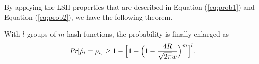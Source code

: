 By applying the LSH properties that are described in Equation (\ref{eq:prob1}) and Equation (\ref{eq:prob2}), we have the following theorem.

\begin{theorem}
\label{the:prob3}
With $l$ groups of $m$ hash functions, the probability is finally enlarged as
\begin{equation}\label{eq:lm:prob3}
\emph{Pr}[\hat\rho_i=\rho_i]\geq 1-\Big[1-\Big(1-\frac{4R}{\sqrt{2\pi}w}\Big)^m\Big]^l.
\end{equation}
\end{theorem}

\begin{comment}
\begin{proof}
After applying $l$ groups of $m$ hash functions, we will obtain $l$ $\hat\rho_i^g$ values $(1\leq g\leq l)$. According to the definition of $\rho_i$, we have
$\hat\rho_i^g \leq \max_{g}\hat\rho_i^g \leq \hat\rho_i$. If
$\max_{g}\hat\rho_i^g \neq \rho_i$, then
$\hat\rho_i^g\neq \rho_i$ for all $1\leq g\leq l$.

From Lemma 1, under a single hash function the probability that $p_i$ and all its $R$-length neighbors are hashed to the same bucket is at least $1-\frac{4R}{\sqrt{2\pi}w}$. With a group of $m$ LSH functions $G=(h_1,h_2,\ldots,h_{m})$ applied on each point, only points sharing all the $m$ hash values are placed in the same partition. Suppose $\hat\rho_i^g$ is the approximated density value for a specific hash function group $G_g(p_i)$. Due to the fact that each LSH function is independently and randomly selected, we have:
\begin{equation}\label{eq:probx}
\begin{aligned}
  \text{Pr}[\hat\rho_i^g=\rho_i]=&\text{Pr}\big[G_g(p_i)=G_g(p_{j})|\forall j, ||p_i,p_j||\leq R\big]\\
  =&\prod_{t=1}^{m}\text{Pr}\big[h_t(p_i)=h_t(p_j)|\forall j, ||p_i,p_j||\leq R\big]\\
  \geq &\Big(1-\frac{4R}{\sqrt{2\pi}w}\Big)^m\notag
\end{aligned}
\end{equation}
Further, since the $l$ groups of hash functions
$G_g(1\leq g\leq l)$ is independently and randomly generated,
we have the following:
\begin{equation}\label{eq:prob3}
\begin{aligned}
  \text{Pr}[\hat\rho_i=\rho_i]=&1-\prod_{g=1}^l\Big(1-\text{Pr}\Big[\hat\rho_i^g=\rho_i\Big]\Big)\\
  \geq &1-\Big[1-\Big(1-\frac{4R}{\sqrt{2\pi}w}\Big)^m\Big]^l\notag
\end{aligned}
\end{equation}
\end{proof}
\end{comment}

